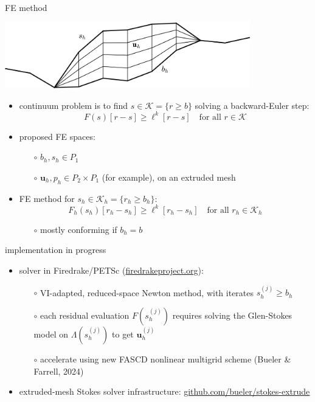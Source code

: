 \documentclass[10pt,dvipsnames]{beamer}
\theoremstyle{theorem}
\newcommand{\bu}{\mathbf{u}}
\newcommand{\cK}{\mathcal{K}}
\begin{document}
\begin{frame}{FE method}

\begin{center}
\includegraphics[width=0.8\textwidth]{extruded}
\end{center}

\begin{itemize}
\item continuum problem is to find $s\in\cK = \{r \ge b\}$ solving a backward-Euler step:
   $$F(s)[r-s] \ge \ell^k[r-s] \quad \text{for all } r \in \cK$$
\item proposed FE spaces:
   \begin{itemize}
   \item[$\circ$] $b_h,s_h \in P_1$
   \item[$\circ$] $\bu_h,p_h \in P_2 \times P_1$ (for example), on an extruded mesh
   \end{itemize}
\item FE method for $s_h\in\cK_h = \{r_h \ge b_h\}$:
   $$F_h(s_h)[r_h-s_h] \ge \ell^k[r_h-s_h] \quad \text{for all } r_h \in \cK_h$$

   \begin{itemize}
   \item[$\circ$] mostly conforming if $b_h=b$
   \end{itemize}
\end{itemize}

\phantom{x}
\end{frame}


\begin{frame}{implementation in progress}

\begin{itemize}
\item solver in Firedrake/PETSc (\href{https://www.firedrakeproject.org/}{firedrakeproject.org}):
    \begin{itemize}
    \item[$\circ$] VI-adapted, reduced-space Newton method, with iterates $s_h^{(j)} \ge b_h$
    \item[$\circ$] each residual evaluation $F(s_h^{(j)})$ requires solving the Glen-Stokes model on $\Lambda(s_h^{(j)})$ to get $\bu_h^{(j)}$
    \item[$\circ$] accelerate using new FASCD nonlinear multigrid scheme (Bueler \& Farrell, 2024)
    \end{itemize}
\item extruded-mesh Stokes solver infrastructure: \href{https://github.com/bueler/stokes-extrude}{github.com/bueler/stokes-extrude}
\end{itemize}

\bigskip
\end{frame}
\end{document}
